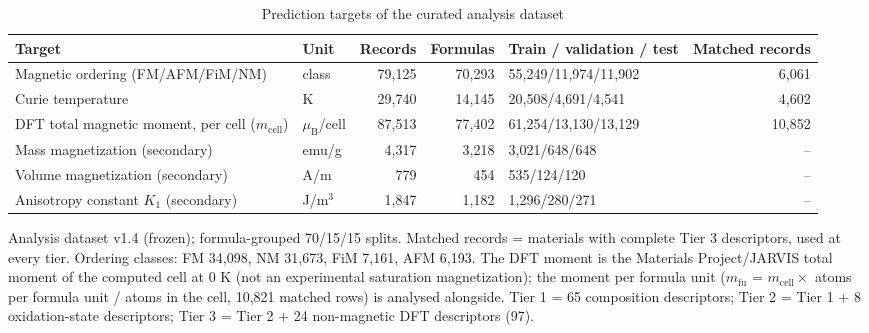 \begin{table}
\caption{Prediction targets of the curated analysis dataset}
\label{tab:table1_dataset}
\tablefont
\begin{tabularx}{\textwidth}{@{}>{\raggedright\arraybackslash}Xlrrlr@{}}
\toprule
\textbf{Target} & \textbf{Unit} & \textbf{Records} & \textbf{Formulas} & \textbf{Train / validation / test} & \textbf{Matched records} \\
\midrule
Magnetic ordering (FM/AFM/FiM/NM) & class & 79,125 & 70,293 & 55,249/11,974/11,902 & 6,061 \\
Curie temperature & K & 29,740 & 14,145 & 20,508/4,691/4,541 & 4,602 \\
DFT total magnetic moment, per cell ($m_\mathrm{cell}$) & $\mu_\mathrm{B}$/cell & 87,513 & 77,402 & 61,254/13,130/13,129 & 10,852 \\
Mass magnetization (secondary) & emu/g & 4,317 & 3,218 & 3,021/648/648 & -- \\
Volume magnetization (secondary) & A/m & 779 & 454 & 535/124/120 & -- \\
Anisotropy constant $K_1$ (secondary) & J/m$^3$ & 1,847 & 1,182 & 1,296/280/271 & -- \\
\bottomrule
\end{tabularx}
\par\vspace{4pt}\raggedright\noindent Analysis dataset v1.4 (frozen); formula-grouped 70/15/15 splits. Matched records = materials with complete Tier 3 descriptors, used at every tier. Ordering classes: FM 34,098, NM 31,673, FiM 7,161, AFM 6,193. The DFT moment is the Materials Project/JARVIS total moment of the computed cell at 0 K (not an experimental saturation magnetization); the moment per formula unit ($m_\mathrm{fu}$ = $m_\mathrm{cell}\times$ atoms per formula unit / atoms in the cell, 10,821 matched rows) is analysed alongside. Tier 1 = 65 composition descriptors; Tier 2 = Tier 1 + 8 oxidation-state descriptors; Tier 3 = Tier 2 + 24 non-magnetic DFT descriptors (97).
\end{table}

